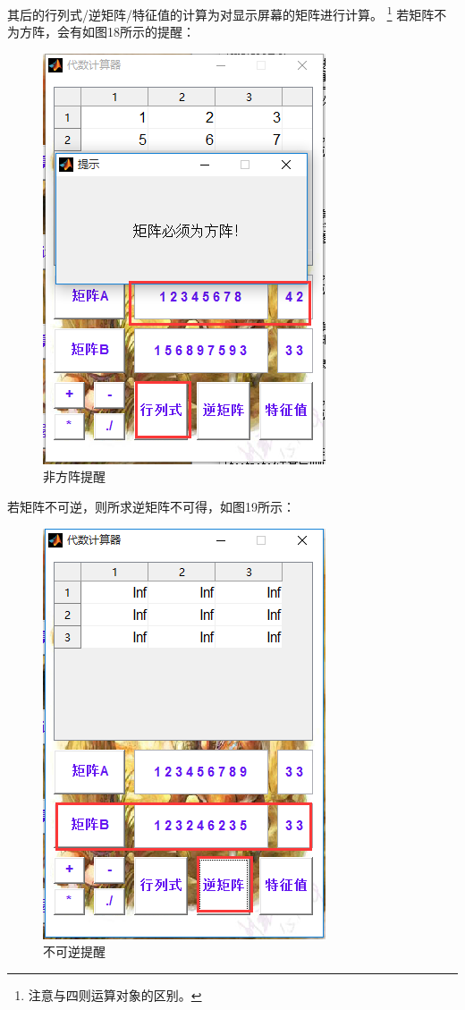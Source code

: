 \documentclass[UTF8]{ctexart}
\begin{document}
其后的行列式/逆矩阵/特征值的计算为对显示屏幕的矩阵进行计算。
\footnote{注意与四则运算对象的区别。}
若矩阵不为方阵，会有如图18所示的提醒：
\begin{figure}[H]
\centering
\includegraphics[scale=0.4]{image/pic12.png}
\caption{非方阵提醒}
\label{fig:pic12}
\end{figure}
若矩阵不可逆，则所求逆矩阵不可得，如图19所示：
\begin{figure}[H]
\centering
\includegraphics[scale=0.4]{image/pic13.png}
\caption{不可逆提醒}
\label{fig:pic13}
\end{figure}
\end{document}

